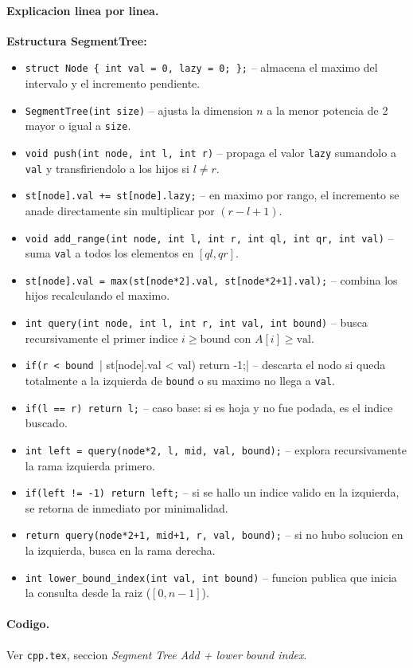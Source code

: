 \paragraph{Explicacion linea por linea.}
\textbf{Estructura SegmentTree:}
\begin{itemize}\setlength\itemsep{0pt}
	\item \verb|struct Node { int val = 0, lazy = 0; };| -- almacena el maximo del intervalo y el incremento pendiente.
	\item \verb|SegmentTree(int size)| -- ajusta la dimension $n$ a la menor potencia de 2 mayor o igual a \texttt{size}.
	\item \verb|void push(int node, int l, int r)| -- propaga el valor \texttt{lazy} sumandolo a \texttt{val} y transfiriendolo a los hijos si $l \ne r$.
	\item \verb|st[node].val += st[node].lazy;| -- en maximo por rango, el incremento se anade directamente sin multiplicar por $(r - l + 1)$.
	\item \verb|void add_range(int node, int l, int r, int ql, int qr, int val)| -- suma \texttt{val} a todos los elementos en $[ql, qr]$.
	\item \verb|st[node].val = max(st[node*2].val, st[node*2+1].val);| -- combina los hijos recalculando el maximo.
	\item \verb|int query(int node, int l, int r, int val, int bound)| -- busca recursivamente el primer indice $i \ge \text{bound}$ con $A[i] \ge \text{val}$.
	\item \verb|if(r < bound || st[node].val < val) return -1;| -- descarta el nodo si queda totalmente a la izquierda de \texttt{bound} o su maximo no llega a \texttt{val}.
	\item \verb|if(l == r) return l;| -- caso base: si es hoja y no fue podada, es el indice buscado.
	\item \verb|int left = query(node*2, l, mid, val, bound);| -- explora recursivamente la rama izquierda primero.
	\item \verb|if(left != -1) return left;| -- si se hallo un indice valido en la izquierda, se retorna de inmediato por minimalidad.
	\item \verb|return query(node*2+1, mid+1, r, val, bound);| -- si no hubo solucion en la izquierda, busca en la rama derecha.
	\item \verb|int lower_bound_index(int val, int bound)| -- funcion publica que inicia la consulta desde la raiz ($[0, n-1]$).
\end{itemize}

\paragraph{Codigo.}
Ver \texttt{cpp.tex}, seccion \textit{Segment Tree Add + lower bound index}.

\vspace{0.5em}

